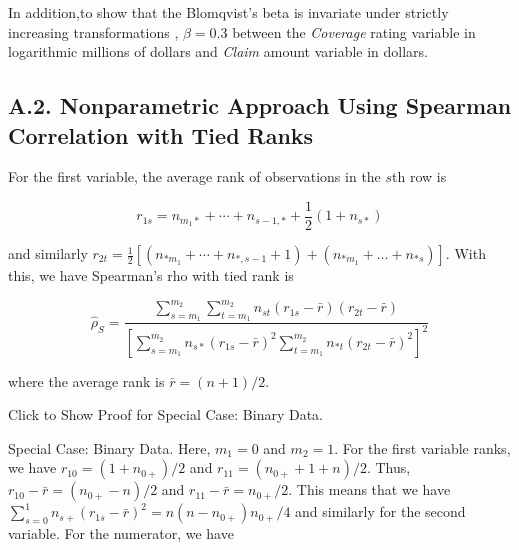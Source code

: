 \documentclass[]{book}
\theoremstyle{definition}
\theoremstyle{definition}
\theoremstyle{definition}
\theoremstyle{remark}
\begin{document}
In addition,to show that the Blomqvist's beta is invariate under
strictly increasing transformations , \(\beta=0.3\) between the
\emph{Coverage} rating variable in logarithmic millions of dollars and
\emph{Claim} amount variable in dollars.

\subsection*{A.2. Nonparametric Approach Using Spearman Correlation with
Tied
Ranks}\label{a.2.-nonparametric-approach-using-spearman-correlation-with-tied-ranks}

For the first variable, the average rank of observations in the \(s\)th
row is

\begin{equation*}
r_{1s} = n_{m_1*}+ \cdots+ n_{s-1,*}+ \frac{1}{2} \left(1+ n_{s*}\right)
\end{equation*}

and similarly
\(r_{2t} = \frac{1}{2} \left[(n_{*m_1}+ \cdots+ n_{*,s-1}+1)+ (n_{*m_1}+ \ldots+ n_{*s})\right]\).
With this, we have Spearman's rho with tied rank is

\begin{equation*}
\hat{\rho}_S = \frac{\sum_{s=m_1}^{m_2} \sum_{t=m_1}^{m_2} n_{st}(r_{1s} - \bar{r})(r_{2t} - \bar{r})}
{\left[\sum_{s=m_1}^{m_2}n_{s*}(r_{1s} - \bar{r})^2 \sum_{t=m_1}^{m_2} n_{*t}(r_{2t} - \bar{r})^2
\right]^2}
\end{equation*}

where the average rank is \(\bar{r} = (n+1)/2\).

Click to Show Proof for Special Case: Binary Data.

\hypertarget{display.Thry.2}{}
Special Case: Binary Data. Here, \(m_1=0\) and \(m_2=1\). For the first
variable ranks, we have \(r_{10} = (1+n_{0+})/2\) and
\(r_{11} = (n_{0+}+1+n)/2\). Thus, \(r_{10} -\bar{r}= (n_{0+}-n)/2\) and
\(r_{11}-\bar{r} = n_{0+}/2\). This means that we have
\(\sum_{s=0}^{1}n_{s+}(r_{1s} - \bar{r})^2 = n (n-n_{0+})n_{0+}/4\) and
similarly for the second variable. For the numerator, we have
\end{document}
